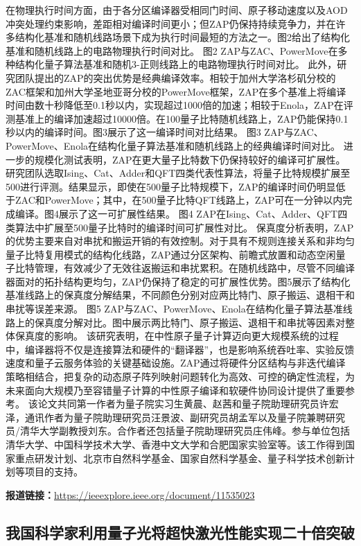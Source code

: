 \documentclass[12pt,a4paper]{ctexart}
\begin{document}
在物理执行时间方面，由于各分区编译器受相同门时间、原子移动速度以及AOD冲突处理约束影响，差距相对编译时间更小；但ZAP仍保持持续竞争力，并在许多结构化基准和随机线路场景下成为执行时间最短的方法之一。图2给出了结构化基准和随机线路上的电路物理执行时间对比。
图2 ZAP与ZAC、PowerMove在多种结构化量子算法基准和随机3-正则线路上的电路物理执行时间对比。
此外，研究团队提出的ZAP的突出优势是经典编译效率。相较于加州大学洛杉矶分校的ZAC框架和加州大学圣地亚哥分校的PowerMove框架，ZAP在多个基准上将编译时间由数十秒降低至0.1秒以内，实现超过1000倍的加速；相较于Enola，ZAP在评测基准上的编译加速超过10000倍。在100量子比特随机线路上，ZAP仍能保持0.1秒以内的编译时间。图3展示了这一编译时间对比结果。
图3 ZAP与ZAC、PowerMove、Enola在结构化量子算法基准和随机线路上的经典编译时间对比。
进一步的规模化测试表明，ZAP在更大量子比特数下仍保持较好的编译可扩展性。研究团队选取Ising、Cat、Adder和QFT四类代表性算法，将量子比特规模扩展至500进行评测。结果显示，即使在500量子比特规模下，ZAP的编译时间仍明显低于ZAC和PowerMove；其中，在500量子比特QFT线路上，ZAP可在一分钟以内完成编译。图4展示了这一可扩展性结果。
图4 ZAP在Ising、Cat、Adder、QFT四类算法中扩展至500量子比特时的编译时间可扩展性对比。
保真度分析表明，ZAP的优势主要来自对串扰和搬运开销的有效控制。对于具有不规则连接关系和非均匀量子比特复用模式的结构化线路，ZAP通过分区架构、前瞻式放置和动态空闲量子比特管理，有效减少了无效往返搬运和串扰累积。在随机线路中，尽管不同编译器面对的拓扑结构更均匀，ZAP仍保持了稳定的可扩展性优势。图5展示了结构化基准线路上的保真度分解结果，不同颜色分别对应两比特门、原子搬运、退相干和串扰等误差来源。
图5 ZAP与ZAC、PowerMove、Enola在结构化量子算法基准线路上的保真度分解对比。图中展示两比特门、原子搬运、退相干和串扰等因素对整体保真度的影响。
该研究表明，在中性原子量子计算迈向更大规模系统的过程中，编译器将不仅是连接算法和硬件的“翻译器”，也是影响系统吞吐率、实验反馈速度和量子云服务体验的关键基础设施。ZAP通过将硬件分区结构与非迭代编译策略相结合，把复杂的动态原子阵列映射问题转化为高效、可控的确定性流程，为未来面向大规模乃至容错量子计算的中性原子编译和软硬件协同设计提供了重要参考。
该论文共同第一作者为量子院实习生黄晨、赵茜和量子院助理研究员许宏泽，通讯作者为量子院助理研究员汪景波、副研究员胡孟军以及量子院兼聘研究员/清华大学副教授刘东。合作者还包括量子院助理研究员庄伟峰。参与单位包括清华大学、中国科学技术大学、香港中文大学和合肥国家实验室等。该工作得到国家重点研发计划、北京市自然科学基金、国家自然科学基金、量子科学技术创新计划等项目的支持。

\noindent\textbf{报道链接：}\url{https://ieeexplore.ieee.org/document/11535023}

\subsection{ 我国科学家利用量子光将超快激光性能实现二十倍突破 }
\end{document}
